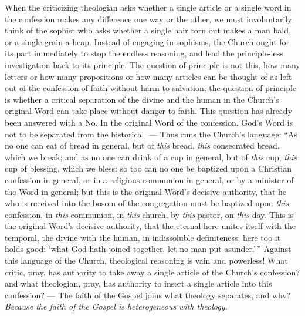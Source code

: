 \documentclass[12pt,a4paper]{book}
\begin{document}
When the criticizing theologian asks whether a single article or a single word
in the confession makes any difference one way or the other, we must
involuntarily think of the sophist who asks whether a single hair torn out makes
a man bald, or a single grain a heap. Instead of engaging in sophisms, the
Church ought for its part immediately to stop the endless reasoning, and lead
the principle-less investigation back to its principle. The question of
principle is not this, how many letters or how many propositions or how many
articles can be thought of as left out of the confession of faith without harm
to salvation; the question of principle is whether a critical separation of the
divine and the human in the Church's original Word can take place without danger
to faith. This question has already been answered with a No. In the original
Word of the confession, God's Word is not to be separated from the historical.
--- Thus runs the Church's language: ``As no one can eat of bread in general,
but of \emph{this} bread, \emph{this} consecrated bread, which we break; and as
no one can drink of a cup in general, but of \emph{this} cup, \emph{this} cup of
blessing, which we bless: so
too can no one be baptized upon a Christian confession in general, or in a
religious communion in general, or by a minister of the Word in general; but
this is the original Word's decisive authority, that he who is received into the
bosom of the congregation must be baptized upon \emph{this} confession, in
\emph{this} communion, in \emph{this} church, by \emph{this} pastor, on
\emph{this} day. This is the original Word's decisive authority, that the eternal
here unites itself with the temporal, the divine with the human, in indissoluble
definiteness; here too it holds good: `what God hath joined together, let no man
put asunder.'\,'' Against this language of the Church, theological reasoning is
vain and powerless! What critic, pray, has authority to take away a single
article of the Church's confession? and what theologian, pray, has authority to
insert a single article into this confession? --- The faith of the Gospel joins
what theology separates, and why? \emph{Because the faith of the Gospel is
heterogeneous with theology.}

\end{document}

